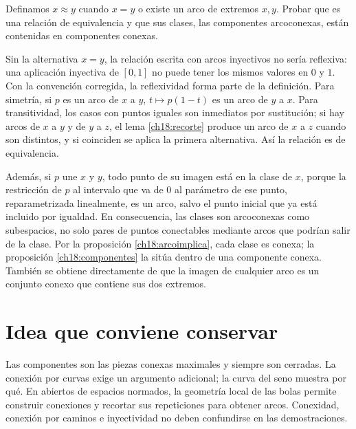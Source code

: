 \begin{ejercicio}
Definamos $x\approx y$ cuando $x=y$ o existe un arco de extremos $x,y$. Probar que es una relación de equivalencia y que sus clases, las componentes arcoconexas, están contenidas en componentes conexas.
\end{ejercicio}
\begin{solucion}
Sin la alternativa $x=y$, la relación escrita con arcos inyectivos no sería reflexiva: una aplicación inyectiva de $[0,1]$ no puede tener los mismos valores en $0$ y $1$. Con la convención corregida, la reflexividad forma parte de la definición. Para simetría, si $p$ es un arco de $x$ a $y$, $t\mapsto p(1-t)$ es un arco de $y$ a $x$. Para transitividad, los casos con puntos iguales son inmediatos por sustitución; si hay arcos de $x$ a $y$ y de $y$ a $z$, el lema \ref{ch18:recorte} produce un arco de $x$ a $z$ cuando son distintos, y si coinciden se aplica la primera alternativa. Así la relación es de equivalencia.

Además, si $p$ une $x$ y $y$, todo punto de su imagen está en la clase de $x$, porque la restricción de $p$ al intervalo que va de $0$ al parámetro de ese punto, reparametrizada linealmente, es un arco, salvo el punto inicial que ya está incluido por igualdad. En consecuencia, las clases son arcoconexas como subespacios, no solo pares de puntos conectables mediante arcos que podrían salir de la clase. Por la proposición \ref{ch18:arcoimplica}, cada clase es conexa; la proposición \ref{ch18:componentes} la sitúa dentro de una componente conexa. También se obtiene directamente de que la imagen de cualquier arco es un conjunto conexo que contiene sus dos extremos.
\end{solucion}

\section{Idea que conviene conservar}
Las componentes son las piezas conexas maximales y siempre son cerradas. La conexión por curvas exige un argumento adicional; la curva del seno muestra por qué. En abiertos de espacios normados, la geometría local de las bolas permite construir conexiones y recortar sus repeticiones para obtener arcos. Conexidad, conexión por caminos e inyectividad no deben confundirse en las demostraciones.
